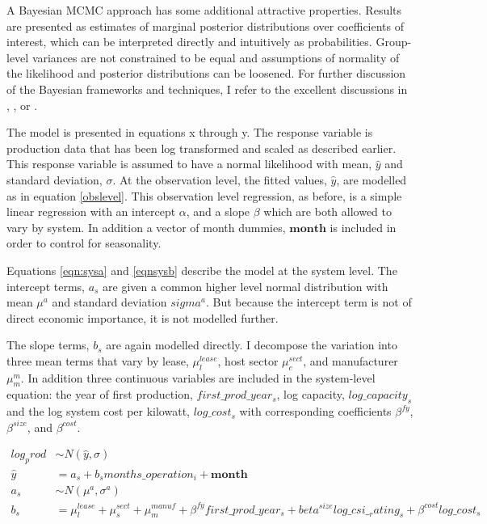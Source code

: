\documentclass[12pt]{article}
\begin{document}
A Bayesian MCMC approach has some additional attractive properties. Results are presented as estimates of marginal posterior distributions over coefficients of interest, which can be interpreted directly and intuitively as probabilities. Group-level variances are not constrained to be equal and assumptions of normality of the likelihood and posterior distributions can be loosened. For further discussion of the Bayesian frameworks and techniques, I refer to the excellent discussions in \citet{gelman_bayesian_2013}, \citet{kruschke_doing_2014}, or \citet{mcelreath_statistical_2017}.

The model is presented in equations x through y. The response variable is production data that has been log transformed and scaled as described earlier. This response variable is assumed to have a normal likelihood with mean, $\hat{y}$ and standard deviation, $\sigma$. At the observation level, the fitted values, $\hat{y}$, are modelled as in equation \ref{obslevel}. This observation level regression, as before, is a simple linear regression with an intercept $\alpha$, and a slope $\beta$ which are both allowed to vary by system. In addition a vector of month dummies, $\mathbf{month}$ is included in order to control for seasonality.

Equations \ref{eqn:sysa} and \ref{eqnsysb} describe the model at the system level. The intercept terms, $a_s$ are given a common higher level normal distribution with mean $\mu^a$ and standard deviation $sigma^a$. But because the intercept term is not of direct economic importance, it is not modelled further.

The slope terms, $b_s$ are again modelled directly. I decompose the variation into three mean terms that vary by lease, $\mu^{lease}_l$, host sector $\mu^{sect}_c$, and manufacturer $\mu^m_m$. In addition three continuous variables are included in the system-level equation: the year of first production, $first\_prod\_year_s$, log capacity, $log\_capacity_s$ and the log system cost per kilowatt, $log\_cost_s$ with corresponding coefficients $\beta^{fy}$, $\beta^{size}$, and $\beta^{cost}$.

\begin{align}
log_prod &\sim N(\hat{y}, \sigma)\\ %
\hat{y} &= a_s + b_s months\_operation_i + \mathbf{month}\\ %
a_s &\sim N(\mu^a, \sigma^a)\\ %
b_s & = \mu^{lease}_l + \mu^{sect}_s + \mu^{manuf}_m + \beta^{fy} first\_prod\_year_s + beta^{size} log\_csi\__rating_s + \beta^{cost} log\_cost_s %
\end{align}
\end{document}
